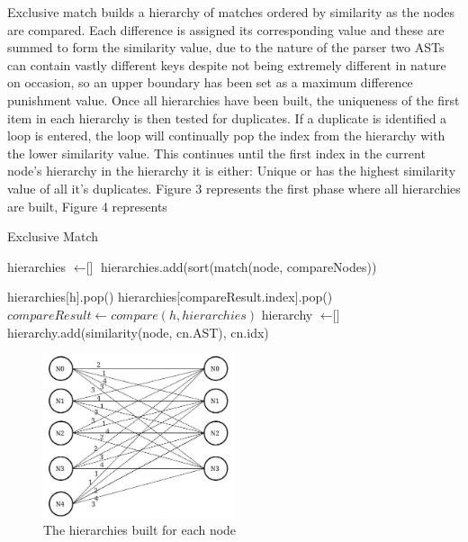 \documentclass[jou,apacite]{apa6}
\begin{document}
Exclusive match builds a hierarchy of matches ordered by similarity as the nodes are compared. Each difference is assigned its corresponding value and these are summed to form the similarity value, due to the nature of the parser two ASTs can contain vastly different keys despite not being extremely different in nature on occasion, so an upper boundary has been set as a maximum difference punishment value. Once all hierarchies have been built, the uniqueness of the first item in each hierarchy is then tested for duplicates. If a duplicate is identified a loop is entered, the loop will continually pop the index from the hierarchy with the lower similarity value. This continues until the first index in the current node's hierarchy in the hierarchy it is either: Unique or has the highest similarity value of all it's duplicates. Figure 3 represents the first phase where all hierarchies are built, Figure 4 represents


\begin{algorithm}
\caption{Exclusive Match}\label{euclid}
\begin{algorithmic}[1]
\State hierarchies $\gets \textit{[]}$
	\State hierarchies.add(sort(match(node, compareNodes))
\EndFor

		\State hierarchies[h].pop()
		 \State hierarchies[compareResult.index].pop()
		\EndIf
		\State $compareResult \gets compare(h, hierarchies)$
	\EndWhile
\EndFor
{}
\State hierarchy $\gets \textit{[]}$
	\State hierarchy.add(similarity(node, cn.AST), cn.idx)
	
\EndFor
\EndProcedure

\end{algorithmic}
\end{algorithm}

\begin{figure}[h]
\caption{The hierarchies built for each node}
\centering
\includegraphics[width=0.50\textwidth]{allhierarchies}
\end{figure}
\end{document}
